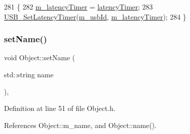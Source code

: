 \begin{DoxyCode}
281                                                     \{
282     \hyperlink{classUsbFTMLInterface_a28342ea2c00af670f1376aaa36ad0236}{m\_latencyTimer} = \hyperlink{classUsbFTMLInterface_ac94dcd155b2e060d5fe04ccfbbb4de8d}{latencyTimer};
283     \hyperlink{LALUsbML_8h_a1a6965b64c7de773855cbdeaf2a62a27}{USB\_SetLatencyTimer}(\hyperlink{classUsbFTMLInterface_aab6754587c303660d5c498ce34a2b4c8}{m\_usbId}, \hyperlink{classUsbFTMLInterface_a28342ea2c00af670f1376aaa36ad0236}{m\_latencyTimer});
284   \}
\end{DoxyCode}
\mbox{\label{classObject_ae30fea75683c2d149b6b6d17c09ecd0c}} 
\subsubsection{\texorpdfstring{set\+Name()}{setName()}}
{\footnotesize\ttfamily void Object\+::set\+Name (\begin{DoxyParamCaption}\item[{std\+::string}]{name }\end{DoxyParamCaption})\hspace{0.3cm}{\ttfamily [inline]}, {\ttfamily [inherited]}}



Definition at line 51 of file Object.\+h.



References Object\+::m\+\_\+name, and Object\+::name().



